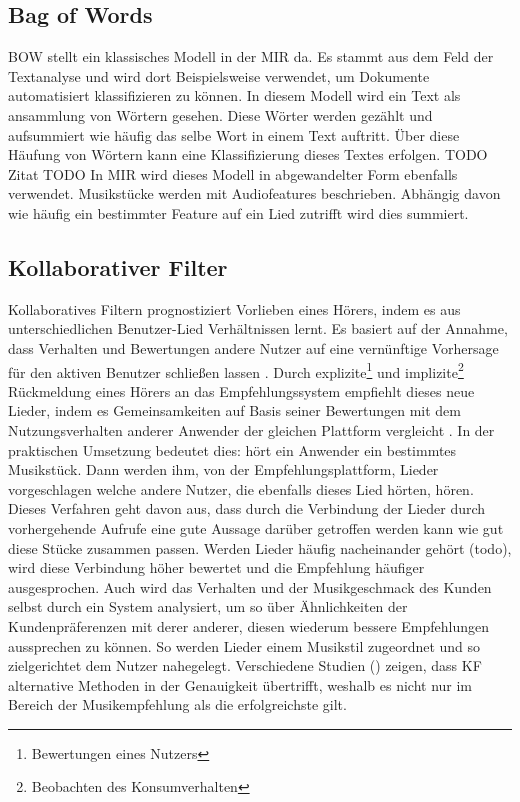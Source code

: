 \documentclass[twosided,a4,10pt]{article}
\begin{document}
\begin{multicols}{2}
		\subsection{Bag of Words}
		BOW stellt ein klassisches Modell in der MIR da. Es stammt aus dem Feld der Textanalyse und wird dort Beispielsweise verwendet, um Dokumente automatisiert klassifizieren zu können. In diesem Modell wird ein Text als ansammlung von Wörtern gesehen. Diese Wörter werden gezählt und aufsummiert wie häufig das selbe Wort in einem Text auftritt. Über diese Häufung von Wörtern kann eine Klassifizierung dieses Textes erfolgen. TODO Zitat TODO In MIR wird dieses Modell in abgewandelter Form ebenfalls verwendet. Musikstücke werden mit Audiofeatures beschrieben. Abhängig davon wie häufig ein bestimmter Feature auf ein Lied zutrifft wird dies summiert.
		\subsection{Kollaborativer Filter}
		Kollaboratives Filtern prognostiziert Vorlieben eines Hörers, indem es aus unterschiedlichen Benutzer-Lied Verhältnissen lernt. Es basiert auf der Annahme, dass Verhalten und Bewertungen andere Nutzer auf eine vernünftige Vorhersage für den aktiven Benutzer schließen lassen \cite{celma}. Durch explizite\footnote[4]{ Bewertungen eines Nutzers} und implizite\footnote[5]{Beobachten des Konsumverhalten} Rückmeldung eines Hörers an das Empfehlungssystem empfiehlt dieses neue Lieder, indem es Gemeinsamkeiten auf Basis seiner Bewertungen mit dem Nutzungsverhalten anderer Anwender der gleichen Plattform vergleicht \cite{mcfee}.\newline
		In der praktischen Umsetzung bedeutet dies: hört ein Anwender ein bestimmtes Musikstück. Dann werden ihm, von der Empfehlungsplattform, Lieder vorgeschlagen welche andere Nutzer, die ebenfalls dieses Lied hörten, hören. Dieses Verfahren geht davon aus, dass durch die Verbindung der Lieder durch vorhergehende Aufrufe eine gute Aussage darüber getroffen werden kann wie gut diese Stücke zusammen passen. Werden Lieder häufig nacheinander gehört (todo), wird diese Verbindung höher bewertet und die Empfehlung häufiger ausgesprochen. Auch wird das Verhalten und der Musikgeschmack des Kunden selbst durch ein System analysiert, um so über Ähnlichkeiten der Kundenpräferenzen mit derer anderer, diesen wiederum bessere Empfehlungen aussprechen zu können. So werden Lieder einem Musikstil zugeordnet und so zielgerichtet dem Nutzer nahegelegt.\newline
		Verschiedene Studien (\cite{mcfee}\cite{barrington}) zeigen, dass KF alternative Methoden in der Genauigkeit übertrifft, weshalb es nicht nur im Bereich der Musikempfehlung als die erfolgreichste gilt.\newline

\end{multicols}
\end{document}
